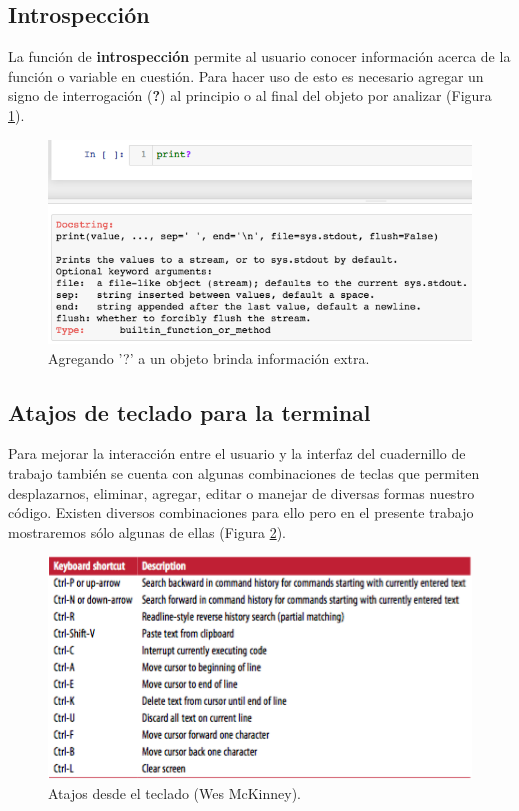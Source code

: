 \documentclass[a4paper]{article}
\begin{document}
\subsection{Introspección}

La función de \textbf{introspección} permite al usuario conocer información acerca de la función o variable en cuestión. Para hacer uso de esto es necesario agregar un signo de interrogación (\textbf{?}) al principio o al final del objeto por analizar (Figura \ref{fig:Inter}).

\begin{figure}[h!]
	\center
	\includegraphics[scale=.4]{./Images/Introspeccion}
	\caption{\label{fig:Inter}Agregando '?' a un objeto brinda información extra.}
\end{figure}

\subsection{Atajos de teclado para la terminal}

Para mejorar la interacción entre el usuario y la interfaz del cuadernillo de trabajo también se cuenta con algunas combinaciones de teclas que permiten desplazarnos, eliminar, agregar, editar o manejar de diversas formas nuestro código. Existen diversos combinaciones para ello pero en el presente trabajo mostraremos sólo algunas de ellas (Figura \ref{fig:Atajos}).

\begin{figure}[h!]
	\center
	\includegraphics[scale=.6]{./Images/Atajos}
	\caption{\label{fig:Atajos}Atajos desde el teclado (Wes McKinney).}
\end{figure}
\end{document}
